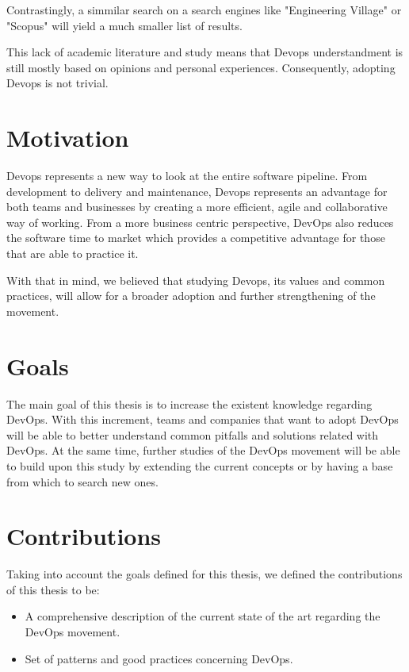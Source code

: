 	Contrastingly, a simmilar search on a search engines like "Engineering Village" or "Scopus" will yield a much smaller list of results.

	This lack of academic literature and study means that Devops understandment is still mostly based on opinions and personal experiences. Consequently, adopting Devops is not trivial.




	\section{Motivation} \label{chap:introduction:sec:motivation}

	Devops represents a new way to look at the entire software pipeline. From development to delivery and maintenance, Devops represents an advantage for both teams and businesses by creating a more efficient, agile and collaborative way of working. From a more business centric perspective, DevOps also reduces the software time to market which provides a competitive advantage for those that are able to practice it.

	With that in mind, we believed that studying Devops, its values and common practices, will allow for a broader adoption and further strengthening of the movement.




	\section{Goals}
	The main goal of this thesis is to increase the existent knowledge regarding DevOps. With this increment, teams and companies that want to adopt DevOps will be able to better understand common pitfalls and solutions related with DevOps. At the same time, further studies of the DevOps movement will be able to build upon this study by extending the current concepts or by having a base from which to search new ones.


  \section{Contributions} \label{chap:introduction:sec:contributions}
	Taking into account the goals defined for this thesis, we defined the contributions of this thesis to be:
    	\begin{itemize}
    		\item{A comprehensive description of the current state of the art regarding the DevOps movement.}
    		\item{Set of patterns and good practices concerning DevOps.}
    	\end{itemize}

